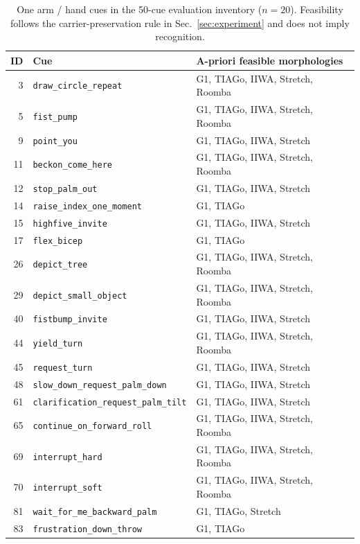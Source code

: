 \begin{table}[t]
\centering
\scriptsize
\setlength{\tabcolsep}{3pt}
\renewcommand{\arraystretch}{1.05}
\begin{tabularx}{\columnwidth}{@{}r>{\raggedright\arraybackslash}X>{\raggedright\arraybackslash}p{2.3cm}@{}}
\toprule
\textbf{ID} & \textbf{Cue} & \textbf{A-priori feasible morphologies} \\
\midrule
3 & \texttt{draw\_circle\_repeat} & G1, TIAGo, IIWA, Stretch, Roomba \\
5 & \texttt{fist\_pump} & G1, TIAGo, IIWA, Stretch, Roomba \\
9 & \texttt{point\_you} & G1, TIAGo, IIWA, Stretch \\
11 & \texttt{beckon\_come\_here} & G1, TIAGo, IIWA, Stretch, Roomba \\
12 & \texttt{stop\_palm\_out} & G1, TIAGo, IIWA, Stretch \\
14 & \texttt{raise\_index\_one\_moment} & G1, TIAGo \\
15 & \texttt{highfive\_invite} & G1, TIAGo, IIWA, Stretch \\
17 & \texttt{flex\_bicep} & G1, TIAGo \\
26 & \texttt{depict\_tree} & G1, TIAGo, IIWA, Stretch, Roomba \\
29 & \texttt{depict\_small\_object} & G1, TIAGo, IIWA, Stretch, Roomba \\
40 & \texttt{fistbump\_invite} & G1, TIAGo, IIWA, Stretch \\
44 & \texttt{yield\_turn} & G1, TIAGo, IIWA, Stretch, Roomba \\
45 & \texttt{request\_turn} & G1, TIAGo, IIWA, Stretch \\
48 & \texttt{slow\_down\_request\_palm\_down} & G1, TIAGo, IIWA, Stretch \\
61 & \texttt{clarification\_request\_palm\_tilt} & G1, TIAGo, IIWA, Stretch \\
65 & \texttt{continue\_on\_forward\_roll} & G1, TIAGo, IIWA, Stretch, Roomba \\
69 & \texttt{interrupt\_hard} & G1, TIAGo, IIWA, Stretch, Roomba \\
70 & \texttt{interrupt\_soft} & G1, TIAGo, IIWA, Stretch, Roomba \\
81 & \texttt{wait\_for\_me\_backward\_palm} & G1, TIAGo, Stretch \\
83 & \texttt{frustration\_down\_throw} & G1, TIAGo \\
\bottomrule
\end{tabularx}
\caption{One arm / hand cues in the 50-cue evaluation inventory ($n=20$). Feasibility follows the carrier-preservation rule in Sec.~\ref{sec:experiment} and does not imply recognition.}
\label{tab:cue-inventory-50-3}
\end{table}

